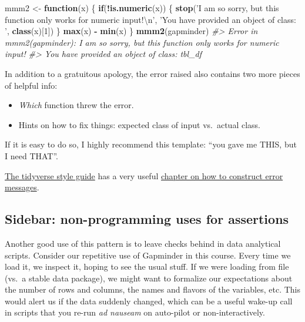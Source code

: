 \documentclass[
]{book}
\newenvironment{Shaded}{\begin{snugshade}}{\end{snugshade}}
\newcommand{\CharTok}[1]{\textcolor[rgb]{0.31,0.60,0.02}{#1}}
\newcommand{\CommentTok}[1]{\textcolor[rgb]{0.56,0.35,0.01}{\textit{#1}}}
\newcommand{\ControlFlowTok}[1]{\textcolor[rgb]{0.13,0.29,0.53}{\textbf{#1}}}
\newcommand{\DecValTok}[1]{\textcolor[rgb]{0.00,0.00,0.81}{#1}}
\newcommand{\KeywordTok}[1]{\textcolor[rgb]{0.13,0.29,0.53}{\textbf{#1}}}
\newcommand{\NormalTok}[1]{#1}
\newcommand{\OperatorTok}[1]{\textcolor[rgb]{0.81,0.36,0.00}{\textbf{#1}}}
\newcommand{\StringTok}[1]{\textcolor[rgb]{0.31,0.60,0.02}{#1}}
\providecommand{\tightlist}{%
  \setlength{\itemsep}{0pt}\setlength{\parskip}{0pt}}
\begin{document}
\begin{Shaded}
\begin{Highlighting}[]
\NormalTok{mmm2 <-}\StringTok{ }\ControlFlowTok{function}\NormalTok{(x) \{}
  \ControlFlowTok{if}\NormalTok{(}\OperatorTok{!}\KeywordTok{is.numeric}\NormalTok{(x)) \{}
    \KeywordTok{stop}\NormalTok{(}\StringTok{'I am so sorry, but this function only works for numeric input!}\CharTok{\textbackslash{}n}\StringTok{'}\NormalTok{,}
         \StringTok{'You have provided an object of class: '}\NormalTok{, }\KeywordTok{class}\NormalTok{(x)[}\DecValTok{1}\NormalTok{])}
\NormalTok{  \}}
  \KeywordTok{max}\NormalTok{(x) }\OperatorTok{-}\StringTok{ }\KeywordTok{min}\NormalTok{(x)}
\NormalTok{\}}
\KeywordTok{mmm2}\NormalTok{(gapminder)}
\CommentTok{#> Error in mmm2(gapminder): I am so sorry, but this function only works for numeric input!}
\CommentTok{#> You have provided an object of class: tbl_df}
\end{Highlighting}
\end{Shaded}

In addition to a gratuitous apology, the error raised also contains two more pieces of helpful info:

\begin{itemize}
\tightlist
\item
  \emph{Which} function threw the error.
\item
  Hints on how to fix things: expected class of input vs.~actual class.
\end{itemize}

If it is easy to do so, I highly recommend this template: ``you gave me THIS, but I need THAT''.

\href{https://style.tidyverse.org}{The tidyverse style guide} has a very useful \href{https://style.tidyverse.org/error-messages.html}{chapter on how to construct error messages}.

\hypertarget{sidebar-non-programming-uses-for-assertions}{%
\subsection{Sidebar: non-programming uses for assertions}\label{sidebar-non-programming-uses-for-assertions}}

Another good use of this pattern is to leave checks behind in data analytical scripts. Consider our repetitive use of Gapminder in this course. Every time we load it, we inspect it, hoping to see the usual stuff. If we were loading from file (vs.~a stable data package), we might want to formalize our expectations about the number of rows and columns, the names and flavors of the variables, etc. This would alert us if the data suddenly changed, which can be a useful wake-up call in scripts that you re-run \emph{ad nauseam} on auto-pilot or non-interactively.
\end{document}
